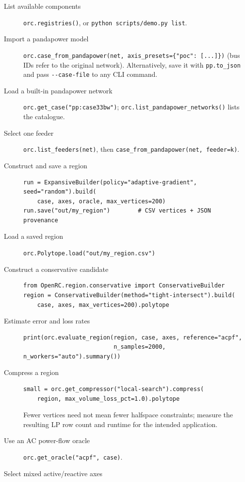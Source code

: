 \documentclass[11pt,a4paper]{report}
\newcommand{\code}[1]{\texttt{\small #1}}
\begin{document}
\begin{description}
\item[List available components] \code{orc.registries()}, or
  \code{python scripts/demo.py list}.
\item[Import a pandapower model]
  \code{orc.case\_from\_pandapower(net, axis\_presets=\{"poc": [...]\})} (bus
  IDs refer to the original network). Alternatively, save it with \code{pp.to\_json} and pass
  \code{-{}-case-file} to any CLI command.
\item[Load a built-in pandapower network]
  \code{orc.get\_case("pp:case33bw")}; \code{orc.list\_pandapower\_networks()}
  lists the catalogue.
\item[Select one feeder]
  \code{orc.list\_feeders(net)}, then \code{case\_from\_pandapower(net,
  feeder=k)}.
\item[Construct and save a region]
\begin{lstlisting}
run = ExpansiveBuilder(policy="adaptive-gradient", seed="random").build(
    case, axes, oracle, max_vertices=200)
run.save("out/my_region")        # CSV vertices + JSON provenance
\end{lstlisting}
\item[Load a saved region] \code{orc.Polytope.load("out/my\_region.csv")}
\item[Construct a conservative candidate]
\begin{lstlisting}
from OpenRC.region.conservative import ConservativeBuilder
region = ConservativeBuilder(method="tight-intersect").build(
    case, axes, max_vertices=200).polytope
\end{lstlisting}
\item[Estimate error and loss rates]
\begin{lstlisting}
print(orc.evaluate_region(region, case, axes, reference="acpf",
                          n_samples=2000, n_workers="auto").summary())
\end{lstlisting}
\item[Compress a region]
\begin{lstlisting}
small = orc.get_compressor("local-search").compress(
    region, max_volume_loss_pct=1.0).polytope
\end{lstlisting}
Fewer vertices need not mean fewer halfspace constraints; measure the resulting
LP row count and runtime for the intended application.
\item[Use an AC power-flow oracle]
  \code{orc.get\_oracle("acpf", case)}.
\item[Select mixed active/reactive axes]

\end{description}
\end{document}
